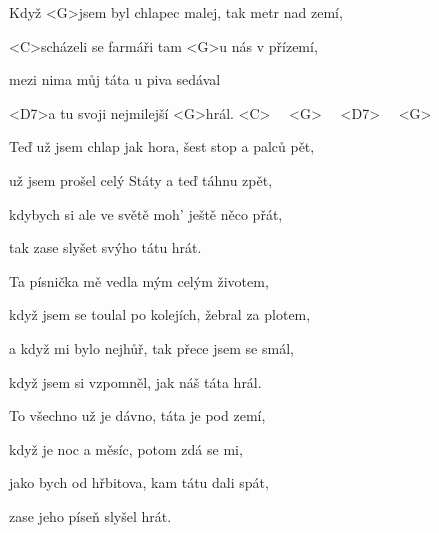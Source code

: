 

\zs
Když <G>jsem byl chlapec malej, tak metr nad zemí,

<C>scházeli se farmáři tam <G>u nás v přízemí,

mezi nima můj táta u piva sedával

<D7>a tu svoji nejmilejší <G>hrál.
<C>~~
<G>~~
<D7>~~
<G>~~
\ks

\zs
Teď už jsem chlap jak hora, šest stop a palců pět,

už jsem prošel celý Státy a teď táhnu zpět,

kdybych si ale ve světě moh' ještě něco přát,

tak zase slyšet svýho tátu hrát.
\ks

\zs
Ta písnička mě vedla mým celým životem,

když jsem se toulal po kolejích, žebral za plotem,

a když mi bylo nejhůř, tak přece jsem se smál,

když jsem si vzpomněl, jak náš táta hrál.
\ks

\zs
To všechno už je dávno, táta je pod zemí,

když je noc a měsíc, potom zdá se mi,

jako bych od hřbitova, kam tátu dali spát,

zase jeho píseň slyšel hrát.
\ks

\kp
